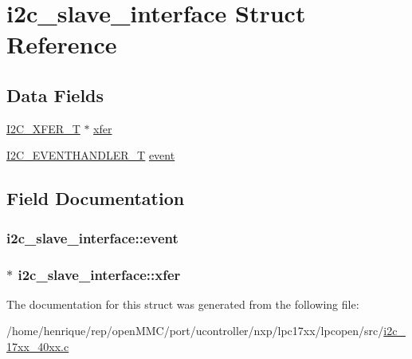 \hypertarget{structi2c__slave__interface}{\section{i2c\-\_\-slave\-\_\-interface Struct Reference}
\label{structi2c__slave__interface}
}
\subsection*{Data Fields}
\begin{DoxyCompactItemize}
\item 
\hyperlink{structI2C__XFER__T}{I2\-C\-\_\-\-X\-F\-E\-R\-\_\-\-T} $\ast$ \hyperlink{structi2c__slave__interface_a934caaab567fddcae9ebec6358047275}{xfer}
\item 
\hyperlink{group__I2C__17XX__40XX_ga932bfc2f55180a71b93427e88b6223e6}{I2\-C\-\_\-\-E\-V\-E\-N\-T\-H\-A\-N\-D\-L\-E\-R\-\_\-\-T} \hyperlink{structi2c__slave__interface_a4b04024cbfed90df358b3546c1e9a2e0}{event}
\end{DoxyCompactItemize}


\subsection{Field Documentation}
\hypertarget{structi2c__slave__interface_a4b04024cbfed90df358b3546c1e9a2e0}{
\subsubsection[{event}]{ i2c\-\_\-slave\-\_\-interface\-::event}}\label{structi2c__slave__interface_a4b04024cbfed90df358b3546c1e9a2e0}
\hypertarget{structi2c__slave__interface_a934caaab567fddcae9ebec6358047275}{
\subsubsection[{xfer}]{$\ast$ i2c\-\_\-slave\-\_\-interface\-::xfer}}\label{structi2c__slave__interface_a934caaab567fddcae9ebec6358047275}


The documentation for this struct was generated from the following file\-:\begin{DoxyCompactItemize}
\item 
/home/henrique/rep/open\-M\-M\-C/port/ucontroller/nxp/lpc17xx/lpcopen/src/\hyperlink{i2c__17xx__40xx_8c}{i2c\-\_\-17xx\-\_\-40xx.\-c}\end{DoxyCompactItemize}
